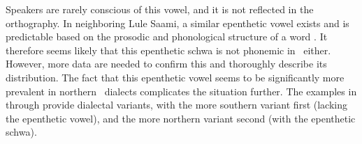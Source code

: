 Speakers are rarely conscious of this vowel, and it is not reflected in the orthography. In neighboring Lule Saami, a similar epenthetic vowel exists and is predictable based on the prosodic and phonological structure of a word \citep[cf.][14--15]{Spiik1989}. It therefore seems likely that this epenthetic schwa is not phonemic in \PS\ either. However, more data are needed to confirm this and thoroughly describe its distribution. The fact that this epenthetic vowel seems to be significantly more prevalent in northern \PS\ dialects complicates the situation further. The examples in  through  provide dialectal variants, with the more southern variant first (lacking the epenthetic vowel), and the more northern variant second (with the epenthetic schwa).
\ea\label{quick}
\z
\ea\label{deliciousPRED}
\z
\ea\label{whitefishNOMSG}
\z


